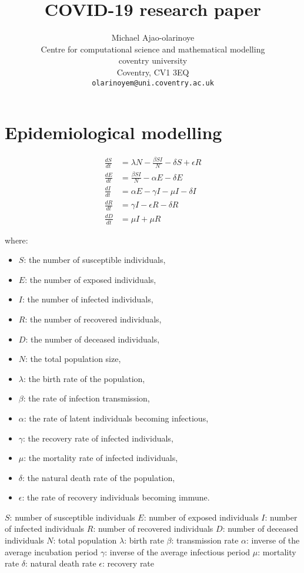 \documentclass{article}
\title{COVID-19 research paper}
\author{
    Michael Ajao-olarinoye\\
    Centre for computational science and mathematical modelling\\
    coventry university\\
    Coventry, CV1 3EQ \\
    \texttt{olarinoyem@uni.coventry.ac.uk}\\
    }
\begin{document}
\maketitle

\section{Epidemiological modelling}

\begin{align}
    \frac{dS}{dt} &= \lambda N - \frac{\beta SI}{N} - \delta S + \epsilon R \\
    \frac{dE}{dt} &= \frac{\beta SI}{N} - \alpha E - \delta E \\
    \frac{dI}{dt} &= \alpha E - \gamma I - \mu I - \delta I \\
    \frac{dR}{dt} &= \gamma I - \epsilon R - \delta R \\
    \frac{dD}{dt} &= \mu I + \mu R
\end{align}
    
where:
\begin{itemize}
    \item $S$: the number of susceptible individuals,
    \item $E$: the number of exposed individuals,
    \item $I$: the number of infected individuals,
    \item $R$: the number of recovered individuals,
    \item $D$: the number of deceased individuals,
    \item $N$: the total population size,
    \item $\lambda$: the birth rate of the population,
    \item $\beta$: the rate of infection transmission,
    \item $\alpha$: the rate of latent individuals becoming infectious,
    \item $\gamma$: the recovery rate of infected individuals,
    \item $\mu$: the mortality rate of infected individuals,
    \item $\delta$: the natural death rate of the population,
    \item $\epsilon$: the rate of recovery individuals becoming immune.
\end{itemize}
    
    $S$: number of susceptible individuals
    $E$: number of exposed individuals
    $I$: number of infected individuals
    $R$: number of recovered individuals
    $D$: number of deceased individuals
    $N$: total population
    $\lambda$: birth rate
    $\beta$: transmission rate
    $\alpha$: inverse of the average incubation period
    $\gamma$: inverse of the average infectious period
    $\mu$: mortality rate
    $\delta$: natural death rate
    $\epsilon$: recovery rate
\end{document}
